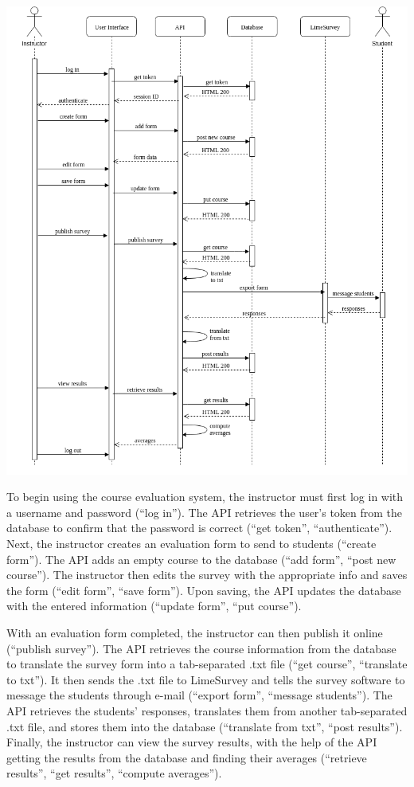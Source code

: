 \documentclass{article}
\begin{document}
\begin{center}
\label{fig:sequencediagram}
{\includegraphics[scale=.7]{images/sequence_diagram.png}} 
\end{center}

To begin using the course evaluation system, the instructor must first log in with a username and password (``log in''). The API retrieves the user's token from the database to confirm that the password is correct (``get token'', ``authenticate''). Next, the instructor creates an evaluation form to send to students (``create form''). The API adds an empty course to the database (``add form'', ``post new course''). The instructor then edits the survey with the appropriate info and saves the form (``edit form'', ``save form''). Upon saving, the API updates the database with the entered information (``update form'', ``put course'').

With an evaluation form completed, the instructor can then publish it online (``publish survey''). The API retrieves the course information from the database to translate the survey form into a tab-separated .txt file (``get course'', ``translate to txt''). It then sends the .txt file to LimeSurvey and tells the survey software to message the students through e-mail (``export form'', ``message students''). The API retrieves the students' responses, translates them from another tab-separated .txt file, and stores them into the database (``translate from txt'', ``post results''). Finally, the instructor can view the survey results, with the help of the API getting the results from the database and finding their averages (``retrieve results'', ``get results'', ``compute averages'').
\end{document}

